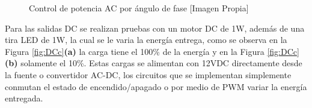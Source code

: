 \begin{figure}[H]
	\centering
	\caption{Control de potencia AC por ángulo de fase [Imagen Propia]}
	\label{fig:ACc}
\end{figure}

Para las salidas DC se realizan pruebas con un motor DC de 1W, además de una tira LED de 1W, la cual se le varia la energía entrega, como se observa en la Figura \ref{fig:DCc}\textbf{(a)} la carga tiene el 100\% de la energía y en la Figura \ref{fig:DCc}\textbf{(b)} solamente el 10\%. Estas cargas se alimentan con 12VDC directamente desde la fuente o convertidor AC-DC, los circuitos que se implementan simplemente conmutan el estado de encendido/apagado o por medio de PWM variar la energía entregada.

